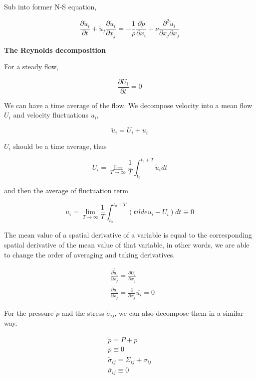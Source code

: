 \documentclass{article}
\begin{document}
Sub into former N-S equation,

\begin{equation*}
    \frac{\partial\tilde u_i}{\partial t}+\tilde u_j\frac{\partial\tilde u_i}{\partial x_j}=-\frac{1}{\rho}\frac{\partial\tilde p}{\partial x_i}+\nu\frac{\partial^2\tilde u_i}{\partial x_j\partial x_j}
\end{equation*}

\textbf{The Reynolds decomposition}

For a steady flow,

\begin{equation*}
    \frac{\partial U_i}{\partial t}=0
\end{equation*}

We can have a time average of the flow. We decompose velocity into a mean flow $U_i$ and velocity fluctuations $u_i$,

\begin{equation*}
    \tilde u_i=U_i+u_i
\end{equation*}

$U_i$ should be a time average, thus

\begin{equation*}
    U_i=\lim_{T\rightarrow\infty}\frac{1}{T}\int_{t_0}^{t_0+T}\tilde u_i dt
\end{equation*}

and then the average of fluctuation term

\begin{equation*}
    \overline u_i=\lim_{T\rightarrow\infty}\frac{1}{T}\int_{t_0}^{t_0+T}(tilde u_i -U_i)dt\equiv 0
\end{equation*}

The mean value of a spatial derivative of a variable is equal to the corresponding spatial derivative of the mean value of that variable, in other words, we are able to change the order of averaging and taking derivatives.

\begin{align*}
     & \overline{\frac{\partial \tilde u_i}{\partial x_j}}=\frac{\partial U_i}{\partial x_j} \\
     & \overline{\frac{\partial u_i}{\partial x_j}}=\frac{\partial}{\partial x_j}\overline{u_i}=0
\end{align*}

For the pressure $\tilde p$ and the stress $\tilde \sigma_{ij}$, we can also decompose them in a similar way.

\begin{gather*}
    \tilde p=P+p\\
    \overline p\equiv0\\
    \tilde\sigma_{ij}=\Sigma_{ij}+\sigma_{ij}\\
    \overline\sigma_{ij}\equiv0
\end{gather*}
\end{document}
